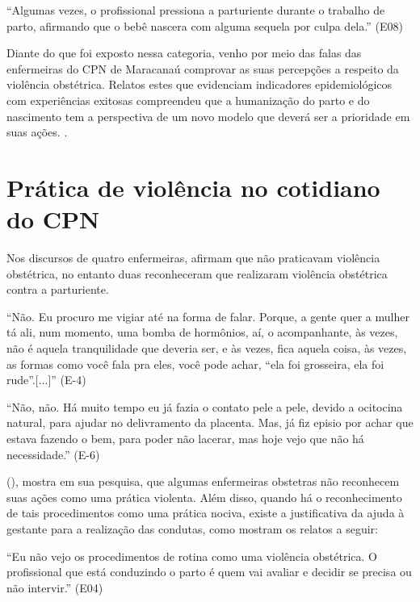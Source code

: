 \begin{citacao}
``Algumas vezes, o profissional pressiona a parturiente durante o trabalho de parto, afirmando que o bebê nascera com alguma sequela por culpa dela.'' (E08)
\end{citacao}

Diante do que foi exposto nessa categoria, venho por meio das falas das enfermeiras do CPN de Maracanaú comprovar as suas percepções a respeito da violência obstétrica. Relatos estes que evidenciam indicadores epidemiológicos com experiências exitosas compreendeu que a humanização do parto e do nascimento tem a perspectiva de um novo modelo que deverá ser a prioridade em suas ações. \cite[p.19]{vico2017avaliaccao}.

\section{Prática de violência no cotidiano do CPN}

Nos discursos de quatro enfermeiras, afirmam que não praticavam violência obstétrica, no entanto duas reconheceram que realizaram violência obstétrica contra a parturiente. 

\begin{citacao}
``Não. Eu procuro me vigiar até na forma de falar. Porque, a gente quer a mulher tá ali, num momento, uma bomba de hormônios, aí, o acompanhante, às vezes, não é aquela tranquilidade que deveria ser, e às vezes, fica aquela coisa, às vezes, as formas como você fala pra eles, você pode achar, ``ela foi grosseira, ela foi rude''.[...]'' (E-4)
\end{citacao}

\begin{citacao}
``Não, não. Há muito tempo eu já fazia o contato pele a pele, devido a ocitocina natural, para ajudar no delivramento da placenta. Mas, já fiz episio por achar que estava fazendo o bem, para poder não lacerar, mas hoje vejo que não há necessidade.'' (E-6)
\end{citacao}

\citeauthor{leal2018percepccao} (\citeyear{leal2018percepccao}), mostra em sua pesquisa, que algumas enfermeiras obstetras não reconhecem suas ações como uma prática violenta. Além disso, quando há o reconhecimento de tais procedimentos como uma prática nociva, existe a justificativa da ajuda à gestante para a realização das condutas, como mostram os relatos a seguir: 

\begin{citacao}
``Eu não vejo os procedimentos de rotina como uma violência obstétrica. O profissional que está conduzindo o parto é quem vai avaliar e decidir se precisa ou não intervir.'' (E04)
\end{citacao}

